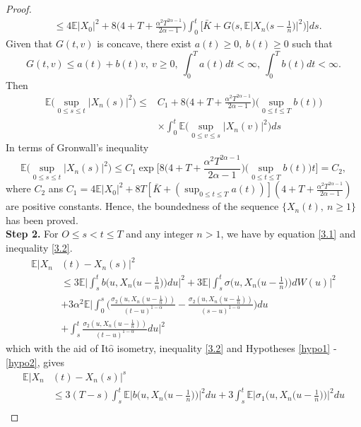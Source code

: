 \documentclass[a4 paper, 12pt]{report}
\theoremstyle{plain}
\begin{document}
\begin{proof}
\begin{align*}
&\leq 4\mathbb{E}|X_0|^2+8\bigg(4+T+\frac{\alpha^2 T^{2\alpha-1}}{2\alpha - 1}\bigg)\int_0^t\bigg[\bar{K}+G\bigg(s,\mathbb{E}\bigg|X_n\bigg(s-\frac{1}{n}\bigg)\bigg|^2\bigg)\bigg]ds.
\end{align*}
Given that $G(t,v)$ is concave, there exist $a(t) \geq 0,~ b(t) \geq 0$ such that
\begin{equation}\label{3.3}
G(t,v)\leq a(t)+b(t)v,~v\geq 0,~\int_0^Ta(t)dt<\infty,~\int_0^Tb(t)dt<\infty.
\end{equation}
Then
\begin{align*}
\mathbb{E}\bigg(\sup_{0\leq s\leq t}|X_n(s)|^2\bigg)\leq&C_1+8\bigg(4+T+\frac{\alpha^2T^{2\alpha-1}}{2\alpha -1}\bigg)\bigg(\sup_{0\leq t\leq T}b(t)\bigg)\\
&\times \int_0^t\mathbb{E}\bigg(\sup_{0\leq v\leq s}|X_n(v)|^2\bigg)ds
\end{align*}
In terms of Gronwall's inequality
$$
\mathbb{E}\bigg(\sup_{0\leq s\leq t}|X_n(s)|^2\bigg)\leq C_1\exp\bigg[8\bigg(4+T+\frac{\alpha^2 T^{2\alpha - 1}}{2\alpha -1 }\bigg)\bigg(\sup_{0\leq t\leq T}b(t)\bigg)t\bigg] = C_2,
$$
where $C_2$ ans $C_1 = 4\mathbb{E}|X_0|^2+8T[\bar{K}+(\sup_{0\leq t\leq T}a(t))](4+T+\frac{\alpha^2T^{2\alpha-1}}{2\alpha - 1})$ are positive  constants. Hence, the boundedness of the sequence $\{X_n(t),~n\geq 1\}$ has been proved.\\
\textbf{Step 2.} For $O\leq s<t\leq T$ and any integer $n>1$, we have by equation \eqref{3.1} and inequality \eqref{3.2}.
\begin{align*}
\mathbb{E}|X_n&(t) - X_n(s)|^2\\
&\leq 3\mathbb{E}\bigg|\int_s^tb\bigg(u,X_n\bigg(u-\frac{1}{n}\bigg)\bigg)du\bigg|^2+3\mathbb{E}\bigg|\int_s^t\sigma\bigg(u,X_n\bigg(u - \frac{1}{n}\bigg)\bigg)dW(u)\bigg|^2\\
&+3\alpha^2\mathbb{E}\bigg|\int_0^s\bigg(\frac{\sigma_2(u,X_n(u-\frac{1}{n}))}{(t-u)^{1-\alpha}} - \frac{\sigma_2(u,X_n(u - \frac{1}{n}))}{(s-u)^{1-\alpha}}\bigg)du\\
&+\int_s^t\frac{\sigma_2(u,X_n(u - \frac{1}{n}))}{(t-u)^{1-\alpha}}du\bigg|^2
\end{align*}
which with the aid of It$\hat{\mbox{o}}$ isometry, inequality \eqref{3.2} and Hypotheses \ref{hypo1} -\ref{hypo2}, gives 
\begin{align*}
\mathbb{E}|X_n&(t) - X_n(s)|^s\\
&\leq 3(T-s)\int_s^t\mathbb{E}\bigg|b\bigg(u,X_n\bigg(u-\frac{1}{n}\bigg)\bigg)\bigg|^2du+3\int_s^t\mathbb{E}\bigg|\sigma_1\bigg(u,X_n\bigg(u-\frac{1}{n}\bigg)\bigg)\bigg|^2du\\

\end{align*}
\end{proof}
\end{document}
